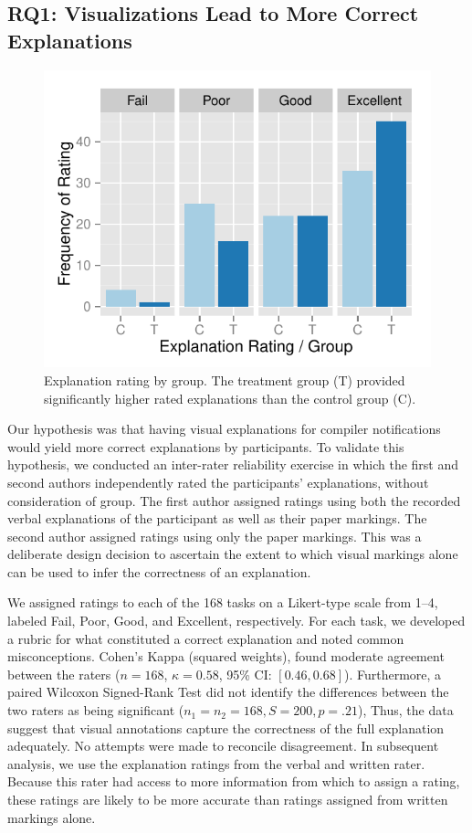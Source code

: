 \documentclass[conference]{IEEEtran}
\begin{document}
\subsection{RQ1: Visualizations Lead to More Correct Explanations}
\label{subsec:result:explanation}

\begin{figure}[!t]
\centering
\includegraphics[width=\linewidth]{ratingbygroup}
\caption{Explanation rating by group. The treatment group (T) provided significantly higher rated explanations than the control group (C).\label{fig:ratingbygroup}}
\end{figure}

Our hypothesis was that having visual explanations for compiler notifications would yield more correct explanations by participants. To validate this hypothesis, we conducted an inter-rater reliability exercise in which the first and second authors independently rated the participants' explanations, without consideration of group. The first author assigned ratings using both the recorded verbal explanations of the participant as well as their paper markings. The second author assigned ratings using only the paper markings. This was a deliberate design decision to ascertain the extent to which visual markings alone can be used to infer the correctness of an explanation.

We assigned ratings to each of the 168 tasks on a Likert-type scale from 1--4, labeled Fail, Poor, Good, and Excellent, respectively. For each task, we developed a rubric for what constituted a correct explanation and noted common misconceptions. Cohen's Kappa (squared weights), found moderate agreement between the raters ($n = 168$, $\kappa = 0.58$, 95\% CI: $[0.46,0.68]$). Furthermore, a paired Wilcoxon Signed-Rank Test did not identify the differences between the two raters as being significant ($n_1 = n_2 = 168, S = 200, p = .21$), Thus, the data suggest that visual annotations capture the correctness of the full explanation adequately. No attempts were made to reconcile disagreement. In subsequent analysis, we use the explanation ratings from the verbal and written rater. Because this rater had access to more information from which to assign a rating, these ratings are likely to be more accurate than ratings assigned from written markings alone.
\end{document}

